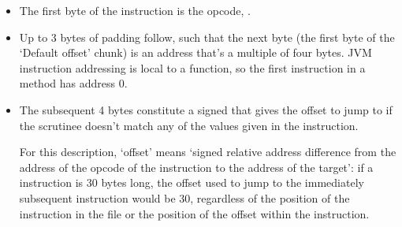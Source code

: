 \documentclass[dissertation.tex]{subfiles}
\begin{document}
{{{\begin{figure}[h]
            \end{figure}

            \begin{itemize}
            \item
            {
                The first byte of the instruction is the opcode, .
            }
            \item
            {

                Up to 3 bytes of padding follow, such that the next byte (the first byte of the `Default offset'
                chunk) is an address that's a multiple of four bytes. JVM instruction addressing is local to a
                function, so the first instruction in a method has address 0.

            }
            \item
            {

                The subsequent 4 bytes constitute a signed  that gives the offset to jump to if the
                scrutinee doesn't match any of the values given in the instruction.

                For this description, `offset' means `signed relative address difference from the address of the opcode
                of the instruction to the address of the target': if a  instruction is 30 bytes
                long, the offset used to jump to the immediately subsequent instruction would be 30, regardless of the
                position of the instruction in the file or the position of the offset within the instruction.

}
\end{itemize}}}}
\end{document}
